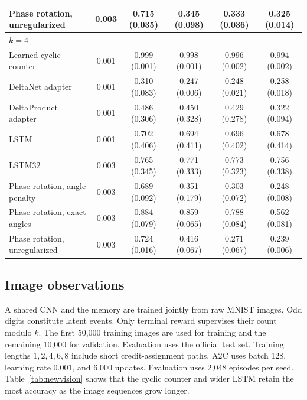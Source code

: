 \begin{table}[H]
\begin{tabular}{lccccc}
Phase rotation, unregularized & 0.003 & 0.715 (0.035) & 0.345 (0.098) & 0.333 (0.036) & 0.325 (0.014) \\
\midrule
\multicolumn{6}{l}{\emph{$k=4$}} \\
Learned cyclic counter & 0.001 & 0.999 (0.001) & 0.998 (0.001) & 0.996 (0.002) & 0.994 (0.002) \\
DeltaNet adapter & 0.001 & 0.310 (0.083) & 0.247 (0.006) & 0.248 (0.021) & 0.258 (0.018) \\
DeltaProduct adapter & 0.001 & 0.486 (0.306) & 0.450 (0.328) & 0.429 (0.278) & 0.322 (0.094) \\
LSTM & 0.001 & 0.702 (0.406) & 0.694 (0.411) & 0.696 (0.402) & 0.678 (0.414) \\
LSTM32 & 0.003 & 0.765 (0.345) & 0.771 (0.333) & 0.773 (0.323) & 0.756 (0.338) \\
Phase rotation, angle penalty & 0.003 & 0.689 (0.092) & 0.351 (0.179) & 0.303 (0.072) & 0.248 (0.008) \\
Phase rotation, exact angles & 0.003 & 0.884 (0.079) & 0.859 (0.065) & 0.788 (0.084) & 0.562 (0.081) \\
Phase rotation, unregularized & 0.003 & 0.724 (0.016) & 0.416 (0.067) & 0.271 (0.067) & 0.239 (0.006) \\
\bottomrule
\end{tabular}
\end{table}

\subsection{Image observations}
A shared CNN and the memory are trained jointly from raw MNIST images. Odd
digits constitute latent events. Only terminal reward supervises their count
modulo $k$. The first 50,000 training images are used for training and the
remaining 10,000 for validation. Evaluation uses the official test set. Training lengths
$1,2,4,6,8$ include short credit-assignment paths. A2C uses batch 128, learning
rate $0.001$, and 6,000 updates. Evaluation uses 2,048 episodes per seed.
Table~\ref{tab:newvision} shows that the cyclic counter and wider LSTM
retain the most accuracy as the image sequences grow longer.

